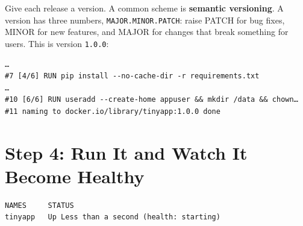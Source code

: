 Give each release a version. A common scheme is \textbf{semantic versioning}. A version has three numbers, \texttt{MAJOR.MINOR.PATCH}: raise PATCH for bug fixes, MINOR for new features, and MAJOR for changes that break something for users. This is version \texttt{1.0.0}:

\begin{codeblock}

\begin{Shaded}
\begin{Highlighting}[]
\end{Highlighting}
\end{Shaded}

\end{codeblock}

\begin{codeblock}
\begin{Verbatim}[formatcom=\outputstyle]
…
#7 [4/6] RUN pip install --no-cache-dir -r requirements.txt
…
#10 [6/6] RUN useradd --create-home appuser && mkdir /data && chown…
#11 naming to docker.io/library/tinyapp:1.0.0 done
\end{Verbatim}
\end{codeblock}

\section{Step 4: Run It and Watch It Become Healthy}\label{09-lab-ship-a-small-python-app-in-a-container:step-4-run-it-and-watch-it-become-healthy}

\begin{codeblock}

\begin{Shaded}
\begin{Highlighting}[]
 
 
\end{Highlighting}
\end{Shaded}

\end{codeblock}

\begin{codeblock}
\begin{Verbatim}[formatcom=\outputstyle]
NAMES     STATUS
tinyapp   Up Less than a second (health: starting)
\end{Verbatim}
\end{codeblock}

